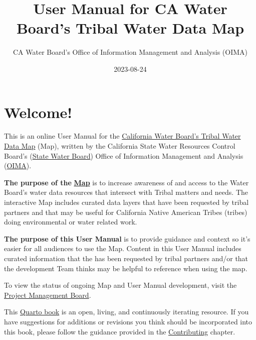 \documentclass[
  letterpaper,
  DIV=11,
  numbers=noendperiod]{scrreprt}
\title{User Manual for CA Water Board's Tribal Water Data Map}
\author{CA Water Board's Office of Information Management and Analysis
(OIMA)}
\date{2023-08-24}
\renewcommand*\contentsname{Table of contents}
\newcommand\contentsname{Table of contents}
\begin{document}
\maketitle

\renewcommand*\contentsname{Table of contents}
{
\hypersetup{linkcolor=}
\setcounter{tocdepth}{2}
\tableofcontents
}


\chapter*{Welcome!}\label{welcome}


This is an online User Manual for the
\href{https://gispublic.waterboards.ca.gov/portal/home/item.html?id=a71c1841907240e1a4d896c8cf2302a8}{California
Water Board's Tribal Water Data Map} (Map), written by the California
State Water Resources Control Board's
(\href{https://www.waterboards.ca.gov/}{State Water Board}) Office of
Information Management and Analysis
(\href{https://www.waterboards.ca.gov/resources/oima/}{OIMA}).

\textbf{The purpose of the}
\href{https://gispublic.waterboards.ca.gov/portal/home/item.html?id=a71c1841907240e1a4d896c8cf2302a8}{\textbf{Map}}
is to increase awareness of and access to the Water Board's water data
resources that intersect with Tribal matters and needs. The interactive
Map includes curated data layers that have been requested by tribal
partners and that may be useful for California Native American Tribes
(tribes) doing environmental or water related work.

\textbf{The purpose of this User Manual} is to provide guidance and
context so it's easier for all audiences to use the Map. Content in this
User Manual includes curated information that the has been requested by
tribal partners and/or that the development Team thinks may be helpful
to reference when using the map.

To view the status of ongoing Map and User Manual development, visit the
\href{https://github.com/orgs/CAWaterBoardDataCenter/projects/8/views/1}{Project
Management Board}.

This \href{https://quarto.org/docs/books}{Quarto book} is an open,
living, and continuously iterating resource. If you have suggestions for
additions or revisions you think should be incorporated into this book,
please follow the guidance provided in the
\href{https://cawaterboarddatacenter.github.io/swamp-manual/contribute.html}{Contributing}
chapter.
\end{document}
